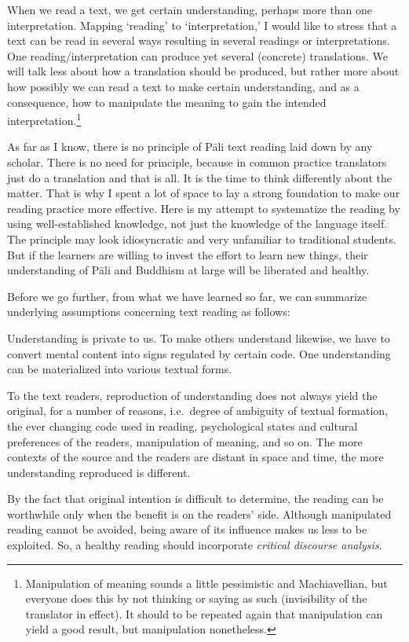 When we read a text, we get certain understanding, perhaps more than one interpretation. Mapping `reading' to `interpretation,' I would like to stress that a text can be read in several ways resulting in several readings or interpretations. One reading/interpretation can produce yet several (concrete) translations. We will talk less about how a translation should be produced, but rather more about how possibly we can read a text to make certain understanding, and as a consequence, how to manipulate the meaning to gain the intended interpretation.\footnote{Manipulation of meaning sounds a little pessimistic and Machiavellian, but everyone does this by not thinking or saying as such (invisibility of the translator in effect). It should to be repeated again that manipulation can yield a good result, but manipulation nonetheless.}

As far as I know, there is no principle of P\=ali text reading laid down by any scholar. There is no need for principle, because in common practice translators just do a translation and that is all. It is the time to think differently about the matter. That is why I spent a lot of space to lay a strong foundation to make our reading practice more effective. Here is my attempt to systematize the reading by using well-established knowledge, not just the knowledge of the language itself. The principle may look idiosyncratic and very unfamiliar to traditional students. But if the learners are willing to invest the effort to learn new things, their understanding of P\=ali and Buddhism at large will be liberated and healthy.

Before we go further, from what we have learned so far, we can summarize underlying assumptions concerning text reading as follows:

\begin{compactenum}[1.]
\item Understanding is private to us. To make others understand likewise, we have to convert mental content into signs regulated by certain code. One understanding can be materialized into various textual forms.
\item To the text readers, reproduction of understanding does not always yield the original, for a number of reasons, i.e.\ degree of ambiguity of textual formation, the ever changing code used in reading, psychological states and cultural preferences of the readers, manipulation of meaning, and so on. The more contexts of the source and the readers are distant in space and time, the more understanding reproduced is different.
\item By the fact that original intention is difficult to determine, the reading can be worthwhile only when the benefit is on the readers' side. Although manipulated reading cannot be avoided, being aware of its influence makes us less to be exploited. So, a healthy reading should incorporate \emph{critical discourse analysis}.
\end{compactenum}

